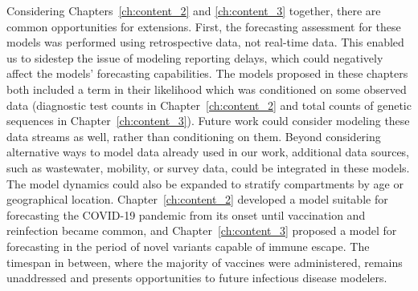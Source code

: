 Considering Chapters~\ref{ch:content_2} and \ref{ch:content_3} together, there are common opportunities for extensions.
First, the forecasting assessment for these models was performed using retrospective data, not real-time data.
This enabled us to sidestep the issue of modeling reporting delays, which could negatively affect the models' forecasting  capabilities.
The models proposed in these chapters both included a term in their likelihood which was conditioned on some observed data (diagnostic test counts in Chapter~\ref{ch:content_2} and total counts of genetic sequences in Chapter~\ref{ch:content_3}).
Future work could consider modeling these data streams as well, rather than conditioning on them.
Beyond considering alternative ways to model data already used in our work, additional data sources, such as wastewater, mobility, or survey data, could be integrated in these models.
The model dynamics could also be expanded to stratify compartments by age or geographical location.
Chapter~\ref{ch:content_2} developed a model suitable for forecasting the COVID-19 pandemic from its onset until vaccination and reinfection became common, and Chapter~\ref{ch:content_3} proposed a model for forecasting in the period of novel variants capable of immune escape.
The timespan in between, where the majority of vaccines were administered, remains unaddressed and presents opportunities to future infectious disease modelers.